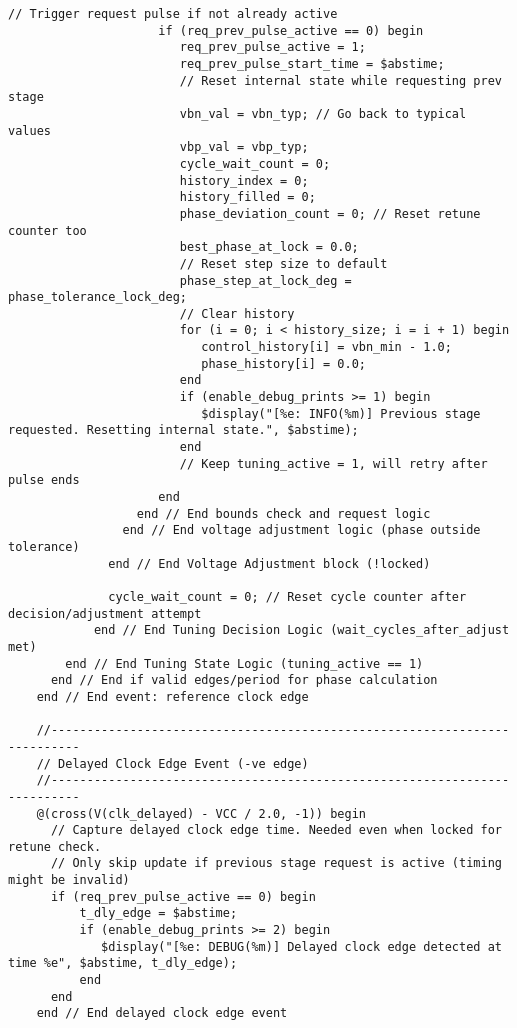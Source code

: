 \begin{lstlisting}[caption={Verilog-A Generic Vb Tuner Implementation}]
                     // Trigger request pulse if not already active
                     if (req_prev_pulse_active == 0) begin
                        req_prev_pulse_active = 1;
                        req_prev_pulse_start_time = $abstime;
                        // Reset internal state while requesting prev stage
                        vbn_val = vbn_typ; // Go back to typical values
                        vbp_val = vbp_typ;
                        cycle_wait_count = 0;
                        history_index = 0;
                        history_filled = 0;
                        phase_deviation_count = 0; // Reset retune counter too
                        best_phase_at_lock = 0.0;
                        // Reset step size to default
                        phase_step_at_lock_deg = phase_tolerance_lock_deg;
                        // Clear history
                        for (i = 0; i < history_size; i = i + 1) begin
                           control_history[i] = vbn_min - 1.0;
                           phase_history[i] = 0.0;
                        end
                        if (enable_debug_prints >= 1) begin
                           $display("[%e: INFO(%m)] Previous stage requested. Resetting internal state.", $abstime);
                        end
                        // Keep tuning_active = 1, will retry after pulse ends
                     end
                  end // End bounds check and request logic
                end // End voltage adjustment logic (phase outside tolerance)
              end // End Voltage Adjustment block (!locked)

              cycle_wait_count = 0; // Reset cycle counter after decision/adjustment attempt
            end // End Tuning Decision Logic (wait_cycles_after_adjust met)
        end // End Tuning State Logic (tuning_active == 1)
      end // End if valid edges/period for phase calculation
    end // End event: reference clock edge

    //--------------------------------------------------------------------------
    // Delayed Clock Edge Event (-ve edge)
    //--------------------------------------------------------------------------
    @(cross(V(clk_delayed) - VCC / 2.0, -1)) begin
      // Capture delayed clock edge time. Needed even when locked for retune check.
      // Only skip update if previous stage request is active (timing might be invalid)
      if (req_prev_pulse_active == 0) begin
          t_dly_edge = $abstime;
          if (enable_debug_prints >= 2) begin
             $display("[%e: DEBUG(%m)] Delayed clock edge detected at time %e", $abstime, t_dly_edge);
          end
      end
    end // End delayed clock edge event


\end{lstlisting}
